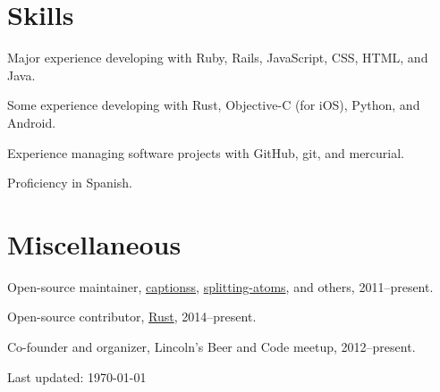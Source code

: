 \documentclass[10pt,letterpaper]{article}
\renewenvironment{itemize}{
  \begin{list}{}{
    \setlength{\leftmargin}{1.5em}
    \setlength{\itemsep}{0.25em}
    \setlength{\parskip}{0pt}
    \setlength{\parsep}{0.25em}
  }
}{
  \end{list}
}
\begin{document}
\section*{Skills}

\begin{itemize}
    \item Major experience developing with Ruby, Rails, JavaScript, CSS,
        HTML, and Java.
    \item Some experience developing with Rust, Objective-C (for iOS),
        Python, and Android.
    \item Experience managing software projects with GitHub, git, and mercurial.
    \item Proficiency in Spanish.
\end{itemize}

\section*{Miscellaneous}

\begin{itemize}
    \item Open-source maintainer,
        \href{http://captionss.com/}{captionss},
        \href{https://github.com/jbranchaud/splitting-atoms}{splitting-atoms},
        and others, 2011--present.
    \item Open-source contributor,
        \href{https://github.com/rust-lang/rust}{Rust}, 2014--present.
    \item Co-founder and organizer, Lincoln's Beer and Code meetup, 2012--present.
\end{itemize}

\bigskip

\begin{center}
  \begin{small}
    Last updated: \today
  \end{small}
\end{center}
\end{document}
